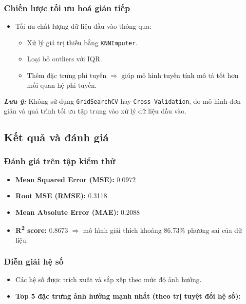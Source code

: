 \subsubsection{Chiến lược tối ưu hoá gián tiếp}
\begin{itemize}
    \item Tối ưu chất lượng dữ liệu đầu vào thông qua:
    \begin{itemize}
        \item Xử lý giá trị thiếu bằng \texttt{KNNImputer}.
        \item Loại bỏ outliers với IQR.
        \item Thêm đặc trưng phi tuyến $\Rightarrow$ giúp mô hình tuyến tính mô tả tốt hơn mối quan hệ phi tuyến.
    \end{itemize}
\end{itemize}

\noindent \textit{\textbf{Lưu ý:}} Không sử dụng \texttt{GridSearchCV} hay \texttt{Cross-Validation}, do mô hình đơn giản và quá trình tối ưu tập trung vào xử lý dữ liệu đầu vào.

\subsection{Kết quả và đánh giá}

\subsubsection{Đánh giá trên tập kiểm thử}
\begin{itemize}
    \item \textbf{Mean Squared Error (MSE):} 0.0972
    \item \textbf{Root MSE (RMSE):} 0.3118
    \item \textbf{Mean Absolute Error (MAE):} 0.2088
    \item \textbf{R\textsuperscript{2} score:} 0.8673 $\Rightarrow$ mô hình giải thích khoảng 86.73\% phương sai của dữ liệu.
\end{itemize}

\subsubsection{Diễn giải hệ số}
\begin{itemize}
    \item Các hệ số được trích xuất và sắp xếp theo mức độ ảnh hưởng.
    \item \textbf{Top 5 đặc trưng ảnh hưởng mạnh nhất (theo trị tuyệt đối hệ số):}
\end{itemize}

